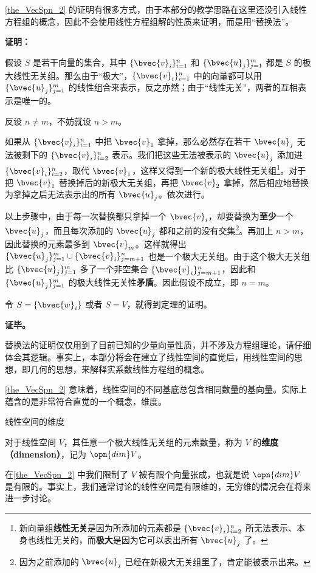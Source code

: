 \autoref{the_VecSpn_2} 的证明有很多方式，由于本部分的教学思路在这里还没引入线性方程组的概念，因此不会使用线性方程组解的性质来证明，而是用“替换法”。

\textbf{证明：}

假设 $S$ 是若干向量的集合，其中 $\{\bvec{v}_i\}_{i=1}^n$ 和 $\{\bvec{u}_j\}^m_{j=1}$ 都是 $S$ 的极大线性无关组。那么由于“极大”，$\{\bvec{v}_i\}_{i=1}^n$ 中的向量都可以用 $\{\bvec{u}_j\}^m_{j=1}$ 的线性组合来表示，反之亦然；由于“线性无关”，两者的互相表示是唯一的。

反设 $n\not=m$，不妨就设 $n>m$。

如果从 $\{\bvec{v}_i\}_{i=1}^n$ 中把 $\bvec{v}_1$ 拿掉，那么必然存在若干 $\bvec{u}_j$ 无法被剩下的 $\{\bvec{v}_i\}_{i=2}^n$ 表示。我们把这些无法被表示的 $\bvec{u}_j$ 添加进 $\{\bvec{v}_i\}_{i=2}^n$，取代 $\bvec{v}_1$，这样又得到一个新的极大线性无关组\footnote{新向量组\textbf{线性无关}是因为所添加的元素都是 $\{\bvec{v}_i\}_{i=2}^n$ 所无法表示、本身也线性无关的，而\textbf{极大}是因为它可以表出所有 $\bvec{u}_j$ 了。}。对于把 $\bvec{v}_1$ 替换掉后的新极大无关组，再把 $\bvec{v}_2$ 拿掉，然后相应地替换为拿掉之后无法表示出的所有 $\bvec{u}_j$。依次进行。

以上步骤中，由于每一次替换都只拿掉一个 $\bvec{v}_i$，却要替换为\textbf{至少}一个 $\bvec{u}_j$，而且每次添加的 $\bvec{u}_j$ 都和之前的没有交集\footnote{因为之前添加的 $\bvec{u}_j$ 已经在新极大无关组里了，肯定能被表示出来。}。再加上 $n>m$，因此替换的元素最多到 $\bvec{v}_m$。这样就得出 $\{\bvec{u}_j\}^m_{j=1}\cup\{\bvec{v}_i\}^n_{j=m+1}$ 也是一个极大无关组。由于这个极大无关组比 $\{\bvec{u}_j\}^m_{j=1}$ 多了一个非空集合 $\{\bvec{v}_i\}^n_{j=m+1}$，因此和 $\{\bvec{u}_j\}^m_{j=1}$ 的极大线性无关性\textbf{矛盾}。因此假设不成立，即 $n=m$。

令 $S=\{\bvec{w}_i\}$ 或者 $S=V$，就得到定理的证明。

\textbf{证毕。}

替换法的证明仅仅用到了目前已知的少量向量性质，并不涉及方程组理论，请仔细体会其逻辑。事实上，本部分将会在建立了线性空间的直觉后，用线性空间的思想，即几何的思想，来解释实系数线性方程组的概念。

\autoref{the_VecSpn_2} 意味着，线性空间的不同基底总包含相同数量的基向量。实际上蕴含的是非常符合直觉的一个概念，维度。

\begin{definition}{线性空间的维度}

对于线性空间 $V$，其任意一个极大线性无关组的元素数量，称为 $V$ 的\textbf{维度（dimension）}，记为 $\opn{dim}V$。

\end{definition}

在\autoref{the_VecSpn_2} 中我们限制了 $V$ 被有限个向量张成，也就是说 $\opn{dim}V$ 是有限的。事实上，我们通常讨论的线性空间是有限维的，无穷维的情况会在将来进一步讨论。



